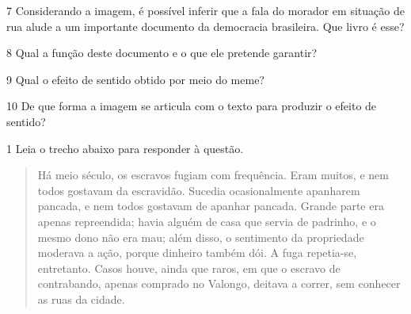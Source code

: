 \num{7} Considerando a imagem, é possível
inferir que a fala do morador em situação de rua alude a um importante
documento da democracia brasileira. Que livro é
esse?


\num{8} Qual a função deste documento e o que ele pretende garantir?


\num{9} Qual o efeito de sentido obtido por meio do meme? 


\num{10} De que forma a imagem se articula com o texto para produzir
o efeito de sentido?



\num{1} Leia o trecho abaixo para responder à questão. 

\begin{quote}

Há meio século, os escravos fugiam com frequência. Eram muitos, e nem todos
gostavam da escravidão. Sucedia ocasionalmente apanharem pancada, e nem todos
gostavam de apanhar pancada. Grande parte era apenas repreendida; havia alguém de
casa que servia de padrinho, e o mesmo dono não era mau; além disso, o sentimento da
propriedade moderava a ação, porque dinheiro também dói. A fuga repetia-se,
entretanto. Casos houve, ainda que raros, em que o escravo de contrabando, apenas
comprado no Valongo, deitava a correr, sem conhecer as ruas da cidade.

\end{quote}


